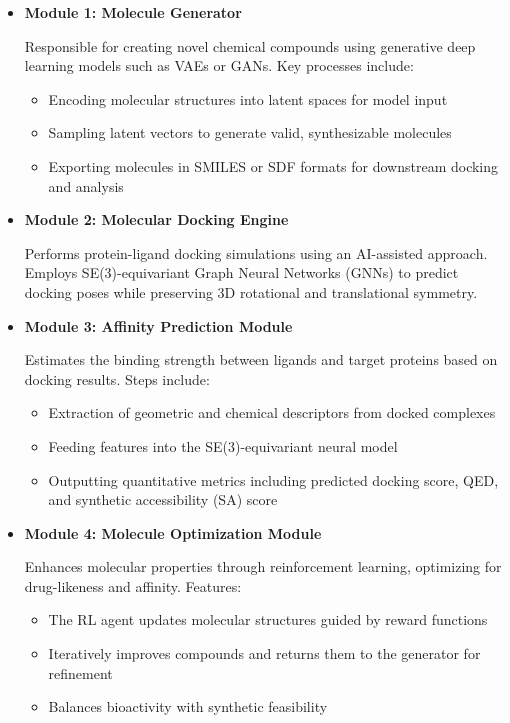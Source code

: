 \documentclass[12pt,a4]{report}
\begin{document}
\begin{itemize}
    \item \textbf{Module 1: Molecule Generator}
    
    \hspace{0.3in}Responsible for creating novel chemical compounds using generative deep learning models such as VAEs or GANs. Key processes include:
    \begin{itemize}
        \item Encoding molecular structures into latent spaces for model input
        \item Sampling latent vectors to generate valid, synthesizable molecules
        \item Exporting molecules in SMILES or SDF formats for downstream docking and analysis
    \end{itemize}

    \item \textbf{Module 2: Molecular Docking Engine}
    
    \hspace{0.3in}Performs protein-ligand docking simulations using an AI-assisted approach. Employs SE(3)-equivariant Graph Neural Networks (GNNs) to predict docking poses while preserving 3D rotational and translational symmetry.

    \item \textbf{Module 3: Affinity Prediction Module}
    
    \hspace{0.3in}Estimates the binding strength between ligands and target proteins based on docking results. Steps include:
    \begin{itemize}
        \item Extraction of geometric and chemical descriptors from docked complexes
        \item Feeding features into the SE(3)-equivariant neural model
        \item Outputting quantitative metrics including predicted docking score, QED, and synthetic accessibility (SA) score
    \end{itemize}

    \item \textbf{Module 4: Molecule Optimization Module}
    
    \hspace{0.3in}Enhances molecular properties through reinforcement learning, optimizing for drug-likeness and affinity. Features:
    \begin{itemize}
        \item The RL agent updates molecular structures guided by reward functions
        \item Iteratively improves compounds and returns them to the generator for refinement
        \item Balances bioactivity with synthetic feasibility
    \end{itemize}


\end{itemize}
\end{document}
